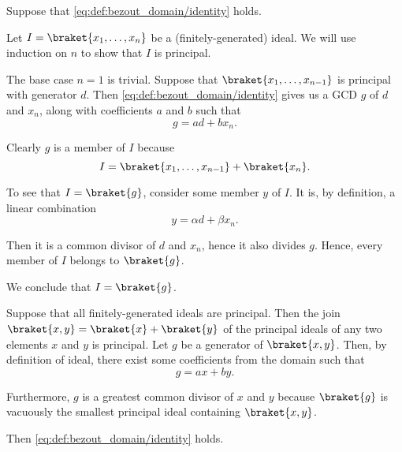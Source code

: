\begin{defproof}
   Suppose that \eqref{eq:def:bezout_domain/identity} holds.

  Let \( I = \braket{ x_1, \ldots, x_n } \) be a (finitely-generated) ideal. We will use induction on \( n \) to show that \( I \) is principal.

  The base case \( n = 1 \) is trivial. Suppose that \( \braket{ x_1, \ldots, x_{n-1} } \) is principal with generator \( d \). Then \eqref{eq:def:bezout_domain/identity} gives us a GCD \( g \) of \( d \) and \( x_n \), along with coefficients \( a \) and \( b \) such that
  \begin{equation*}
    g = ad + bx_n.
  \end{equation*}

  Clearly \( g \) is a member of \( I \) because
  \begin{equation*}
    I = \braket{ x_1, \ldots, x_{n-1} } + \braket{ x_n }.
  \end{equation*}

  To see that \( I = \braket{ g } \), consider some member \( y \) of \( I \). It is, by definition, a linear combination
  \begin{equation*}
    y = \alpha d + \beta x_n.
  \end{equation*}

  Then it is a common divisor of \( d \) and \( x_n \), hence it also divides \( g \). Hence, every member of \( I \) belongs to \( \braket{ g } \).

  We conclude that \( I = \braket{ g } \).

   Suppose that all finitely-generated ideals are principal. Then the join \( \braket{ x, y } =\braket{ x } + \braket{ y } \) of the principal ideals of any two elements \( x \) and \( y \) is principal. Let \( g \) be a generator of \( \braket{ x, y } \). Then, by definition of ideal, there exist some coefficients from the domain such that
  \begin{equation*}
    g = ax + by.
  \end{equation*}

  Furthermore, \( g \) is a greatest common divisor of \( x \) and \( y \) because \( \braket{ g } \) is vacuously the smallest principal ideal containing \( \braket{ x, y } \).

  Then \eqref{eq:def:bezout_domain/identity} holds.
\end{defproof}

